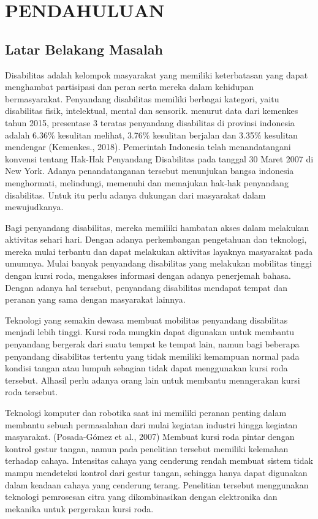 \chapter{PENDAHULUAN}
\section{Latar Belakang Masalah}
Disabilitas adalah kelompok masyarakat yang memiliki keterbatasan yang dapat menghambat partisipasi dan peran serta mereka dalam kehidupan bermasyarakat. Penyandang disabilitas memiliki berbagai kategori, yaitu disabilitas fisik, intelektual, mental dan sensorik.
menurut data dari kemenkes tahun 2015, presentase 3 teratas penyandang disabilitas di provinsi indonesia adalah 6.36\% kesulitan melihat, 3.76\% kesulitan berjalan dan 3.35\% kesulitan mendengar (Kemenkes., 2018). Pemerintah Indonesia telah menandatangani konvensi tentang Hak-Hak Penyandang Disabilitas pada tanggal 30 Maret 2007 di New York. Adanya penandatanganan tersebut menunjukan bangsa indonesia menghormati, melindungi, memenuhi dan memajukan hak-hak penyandang disabilitas. Untuk itu perlu adanya dukungan dari masyarakat dalam mewujudkanya. 

Bagi penyandang disabilitas, mereka memiliki hambatan akses dalam melakukan aktivitas sehari hari. Dengan adanya perkembangan pengetahuan dan teknologi, mereka mulai terbantu dan dapat melakukan aktivitas layaknya masyarakat pada umumnya.
Mulai banyak penyandang disabilitas yang melakukan mobilitas tinggi dengan kursi roda, mengakses informasi dengan adanya penerjemah bahasa. Dengan adanya hal tersebut, penyandang disabilitas mendapat tempat dan peranan yang sama dengan masyarakat lainnya.

Teknologi yang semakin dewasa membuat mobilitas penyandang disabilitas menjadi lebih tinggi. Kursi roda mungkin dapat digunakan untuk membantu penyandang bergerak dari suatu tempat ke tempat lain, namun bagi beberapa penyandang disabilitas tertentu yang tidak memiliki kemampuan normal pada kondisi tangan atau lumpuh sebagian tidak dapat menggunakan kursi roda tersebut. Alhasil perlu adanya orang lain untuk membantu menngerakan kursi roda tersebut. 

Teknologi komputer dan robotika saat ini memiliki peranan penting dalam membantu sebuah permasalahan dari mulai kegiatan industri hingga kegiatan masyarakat. (Posada-Gómez et al., 2007) Membuat kursi roda pintar dengan kontrol gestur tangan, namun pada penelitian tersebut memiliki kelemahan terhadap cahaya. Intensitas cahaya yang cenderung rendah membuat sistem tidak mampu mendeteksi kontrol dari gestur tangan, sehingga hanya dapat digunakan dalam keadaan cahaya yang cenderung terang. Penelitian tersebut menggunakan teknologi pemrosesan citra yang dikombinasikan dengan elektronika dan mekanika untuk pergerakan kursi roda.

